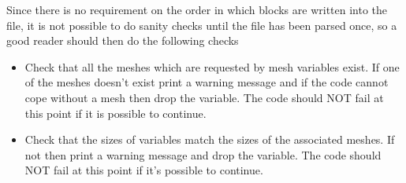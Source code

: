 \documentclass[8pt]{article}
\begin{document}
Since there is no requirement on the order in which blocks are written into the file, it is not possible to do sanity checks until the file has been parsed once, so a good reader should then do the following checks
\begin{itemize}
\item Check that all the meshes which are requested by mesh variables exist. If one of the meshes doesn't exist print a warning message and if the code cannot cope without a mesh then drop the variable. The code should NOT fail at this point if it is possible to continue.
\item Check that the sizes of variables match the sizes of the associated meshes. If not then print a warning message and drop the variable. The code should NOT fail at this point if it's possible to continue.
\end{itemize}
\end{document}
